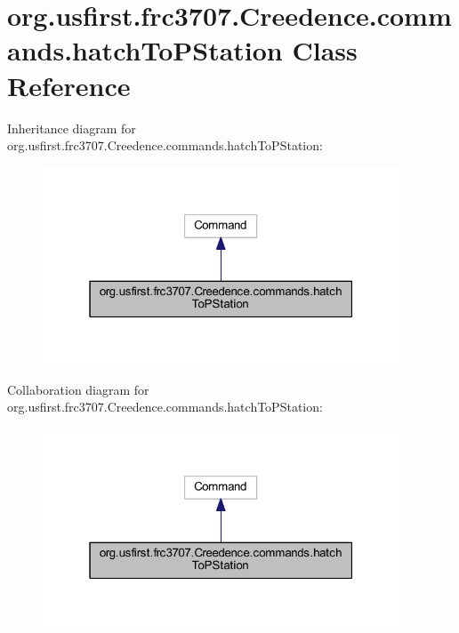 \hypertarget{classorg_1_1usfirst_1_1frc3707_1_1_creedence_1_1commands_1_1hatch_to_p_station}{}\section{org.\+usfirst.\+frc3707.\+Creedence.\+commands.\+hatch\+To\+P\+Station Class Reference}
\label{classorg_1_1usfirst_1_1frc3707_1_1_creedence_1_1commands_1_1hatch_to_p_station}


Inheritance diagram for org.\+usfirst.\+frc3707.\+Creedence.\+commands.\+hatch\+To\+P\+Station\+:
\nopagebreak
\begin{figure}[H]
\begin{center}
\leavevmode
\includegraphics[width=301pt]{classorg_1_1usfirst_1_1frc3707_1_1_creedence_1_1commands_1_1hatch_to_p_station__inherit__graph}
\end{center}
\end{figure}


Collaboration diagram for org.\+usfirst.\+frc3707.\+Creedence.\+commands.\+hatch\+To\+P\+Station\+:
\nopagebreak
\begin{figure}[H]
\begin{center}
\leavevmode
\includegraphics[width=301pt]{classorg_1_1usfirst_1_1frc3707_1_1_creedence_1_1commands_1_1hatch_to_p_station__coll__graph}
\end{center}
\end{figure}
